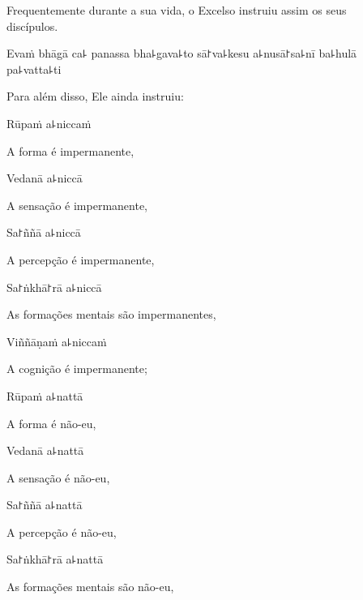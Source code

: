 \begin{english}
  Frequentemente durante a sua vida, o Excelso instruiu assim os seus\\ discípulos.
\end{english}

Evaṁ bhāgā ca꜕ panassa bha꜕gava꜕to sā꜓va꜕kesu a꜕nusā꜓sa꜕nī ba꜕hulā pa꜕vatta꜕ti

\begin{english}
  Para além disso, Ele ainda instruiu:
\end{english}


Rūpaṁ a꜕niccaṁ

\begin{english}
  A forma é impermanente,
\end{english}

Vedanā a꜕niccā

\begin{english}
  A sensação é impermanente,
\end{english}

Sa꜓ññā a꜕niccā

\begin{english}
  A percepção é impermanente,
\end{english}

Sa꜓ṅkhā꜓rā a꜕niccā

\begin{english}
  As formações mentais são impermanentes,
\end{english}

Viññāṇaṁ a꜕niccaṁ

\begin{english}
  A cognição é impermanente;
\end{english}

Rūpaṁ a꜕nattā

\begin{english}
  A forma é não-eu,
\end{english}

Vedanā a꜕nattā

\begin{english}
  A sensação é não-eu,
\end{english}

Sa꜓ññā a꜕nattā

\begin{english}
  A percepção é não-eu,
\end{english}

Sa꜓ṅkhā꜓rā a꜕nattā

\begin{english}
  As formações mentais são não-eu,
\end{english}

